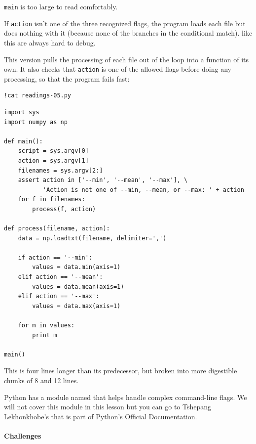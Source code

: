 \documentclass{book}
\begin{document}
\begin{swcenumerate}
\item
  \texttt{main} is too large to read comfortably.
\item
  If \texttt{action} isn't one of the three recognized flags, the
  program loads each file but does nothing with it (because none of the
  branches in the conditional match).  like this are always hard to debug.
\end{swcenumerate}

This version pulls the processing of each file out of the loop into a
function of its own. It also checks that \texttt{action} is one of the
allowed flags before doing any processing, so that the program fails
fast:

\begin{verbatim}
!cat readings-05.py
\end{verbatim}

\begin{verbatim}
import sys
import numpy as np

def main():
    script = sys.argv[0]
    action = sys.argv[1]
    filenames = sys.argv[2:]
    assert action in ['--min', '--mean', '--max'], \
           'Action is not one of --min, --mean, or --max: ' + action
    for f in filenames:
        process(f, action)

def process(filename, action):
    data = np.loadtxt(filename, delimiter=',')

    if action == '--min':
        values = data.min(axis=1)
    elif action == '--mean':
        values = data.mean(axis=1)
    elif action == '--max':
        values = data.max(axis=1)

    for m in values:
        print m

main()
\end{verbatim}

This is four lines longer than its predecessor, but broken into more
digestible chunks of 8 and 12 lines.

Python has a module named
 that
helps handle complex command-line flags. We will not cover this module
in this lesson but you can go to Tshepang Lekhonkhobe's
that is part of Python's Official Documentation.

\mbox{}\paragraph{Challenges}
\end{document}
